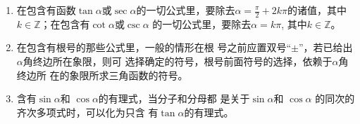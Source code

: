 \begin{example}
    
\end{example}

\begin{example}
    
\end{example}

\begin{example}
    
\end{example}

\begin{example}
    
\end{example}

\begin{example}
    
\end{example}












\newpage

\begin{rmk}
\begin{enumerate}
    \item 在包含有函数$\tan\alpha$或$\sec\alpha$的一切公式里，要除去$\alpha=\frac{\pi}{2}+2k\pi$的诸值，其中$k\in\mathbb{Z}$；在包含有$\cot\alpha$或$\csc\alpha$
    的一切公式里，要除去$\alpha=k\pi$, 其中$k\in\mathbb{Z}$。
    \item 在包含有根号的那些公式里，一般的情形在根
    号之前应置双号“$\pm$”，若已给出$\alpha$角终边所在象限，则可
    选择确定的符号，根号前面符号的选择，依赖于$\alpha$角终边所
    在的象限所求三角函数的符号。
    \item 含有$\sin\alpha$和
    $\cos\alpha$的有理式，当分子和分母都
    是关于$\sin\alpha$和
    $\cos\alpha$
    的同次的齐次多项式时，可以化为只含
    有$\tan\alpha$的有理式。
\end{enumerate} 
\end{rmk}


